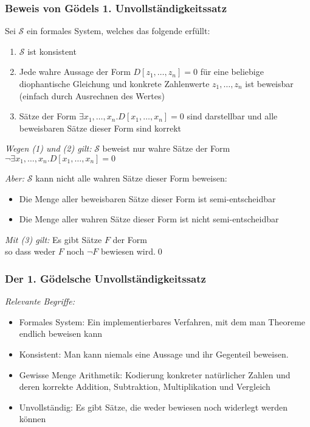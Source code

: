 \documentclass[aspectratio=1610,onlymath]{beamer}
\begin{document}
\begin{frame}\frametitle{Beweis von Gödels 1. Unvollständigkeitssatz}

Sei $\mathcal{S}$ ein formales System, welches das folgende erfüllt:
\begin{enumerate}[(1)]
\item $\mathcal{S}$ ist konsistent
\item Jede wahre Aussage der Form $D[z_1,\ldots,z_n]= 0$ für eine beliebige diophantische Gleichung und \alert{konkrete} Zahlenwerte $z_1,\ldots, z_n$ ist beweisbar\\ {\tiny(einfach durch Ausrechnen des Wertes)}
\item Sätze der Form $\exists x_1,\ldots, x_n.D[x_1,\ldots,x_n]= 0$ sind darstellbar und alle beweisbaren Sätze dieser Form sind korrekt
\end{enumerate}\pause
\emph{Wegen (1) und (2) gilt:} $\mathcal{S}$ beweist nur wahre Sätze der Form $\neg\exists x_1,\ldots, x_n.D[x_1,\ldots,x_n]= 0$\medskip\pause

\emph{Aber:} $\mathcal{S}$ kann nicht alle wahren Sätze dieser Form beweisen:
\begin{itemize}
\item Die Menge aller beweisbaren Sätze dieser Form ist semi-entscheidbar
\item Die Menge aller wahren Sätze dieser Form ist nicht semi-entscheidbar
\end{itemize}\pause
\emph{Mit (3) gilt:} Es gibt Sätze $F$ der Form \\ so dass weder $F$ noch $\neg F$ bewiesen wird.\qed

\end{frame}

\begin{frame}\frametitle{Der 1. Gödelsche Unvollständigkeitssatz}

\bigskip

\emph{Relevante Begriffe:}
\begin{itemize}
\item \alert{Formales System:} Ein implementierbares Verfahren, mit dem man Theoreme endlich beweisen kann
\item \alert{Konsistent:} Man kann niemals eine Aussage und ihr Gegenteil beweisen.
\item \alert{Gewisse Menge Arithmetik:} Kodierung konkreter natürlicher Zahlen und deren korrekte Addition, Subtraktion, Multiplikation und Vergleich
\item \alert{Unvollständig:} Es gibt Sätze, die weder bewiesen noch widerlegt werden können
\end{itemize}

\end{frame}
\end{document}

